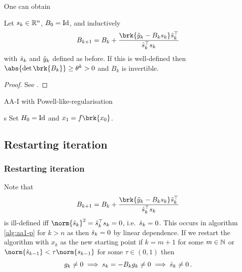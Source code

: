 \begin{frame}
	One can obtain
	\begin{lemma}
		Let $s_k\in\mathbb{R}^n$, $B_0=\operatorname{Id}$, and inductively
		\begin{align*}
			B_{k+1} = B_k+\frac{\brk{\tiy_k-B_ks_k}\hs_k^\top}{\hs_k^\top s_k}
		\end{align*}
		with $\hat{s}_k$ and $\tilde{y}_k$ defined as before. If this is well-defined then $\abs{\det\brk{B_k}}\geq \theta^k>0$ and $B_k$ is invertible.
	\end{lemma}
	\begin{proof}
		See \cite[Lemma 2]{ZhaAA}.
	\end{proof}
\end{frame}

\begin{frame}
	\begin{algorithm}[H]
	\caption{AA-I with Powell-like-regularisation}\label{alg:aa1-p}
	\color{gray}
s	
	\BlankLine
	Set $H_0=\operatorname{Id}$ and $x_1=f\brk{x_0}$.
	
	\end{algorithm}
\end{frame}

\subsection{Restarting iteration}
\begin{frame}
	\frametitle{Restarting iteration}
	Note that
	\begin{align*}
		B_{k+1} = B_k+\frac{\brk{\tiy_k-B_ks_k}\hs_k^\top}{\hs_k^\top s_k}
	\end{align*}
	is ill-defined iff $\norm{\hs_k}^2=\hs_k^\top s_k=0$, i.e.\ $\hat{s}_k=0$. This occurs in algorithm \ref{alg:aa1-p} for $k>n$ as then $\hat{s}_k=0$ by linear dependence.
	If we restart the algorithm with $x_k$ as the new starting point if $k=m+1$ for some $m\in\mathbb{N}$ or $\norm{\hs_{k-1}}<\tau\norm{s_{k-1}}$ for some $\tau\in(0,1)$
	then 
	$$g_k\neq 0 \implies s_k=-B_kg_k\neq 0\implies \hat{s}_k\neq 0\,.$$
\end{frame}

